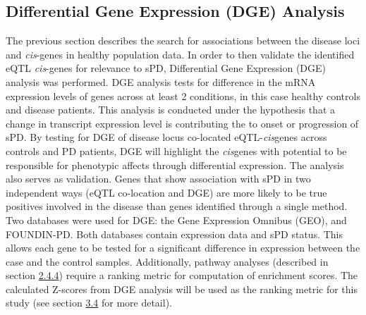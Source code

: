 \documentclass{article}
\begin{document}
\subsection{Differential Gene Expression (DGE) Analysis}
\label{subsec:validation}
The previous section describes the search for associations between the disease loci and \textit{cis}-genes in healthy population data. In order to then validate the identified eQTL \textit{cis}-genes for relevance to sPD, Differential Gene Expression (DGE) analysis  was performed. DGE analysis tests for difference in the mRNA expression levels of genes across at least 2 conditions, in this case healthy controls and disease patients. This analysis is conducted under the hypothesis that a change in transcript expression level is contributing the to onset or progression of sPD. By testing for DGE of disease locus co-located eQTL-\textit{cis}genes across controls and PD patients, DGE will highlight the \textit{cis}genes with potential to be responsible for phenotypic affects through differential expression. The analysis also serves as validation. Genes that show association with sPD in two independent ways (eQTL co-location and DGE) are more likely to be true positives involved in the disease than genes identified through a single method.  Two databases were used for DGE: the Gene Expression Omnibus (GEO), and FOUNDIN-PD. Both databases contain expression data and sPD status. This allows each gene to be tested for a significant difference in expression between the case and the control samples.
Additionally, pathway analyses (described in section \hyperref[subsubsec:pathwaysandnetworks]{2.4.4}) require a ranking metric for computation of enrichment scores. The calculated Z-scores from DGE analysis will be used as the ranking metric for this study (see section \hyperref[subsec:pathways]{3.4} for more detail). 
\end{document}
